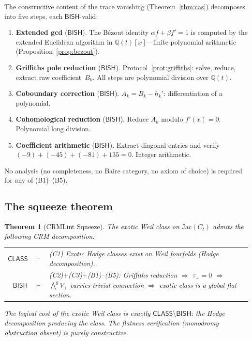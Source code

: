 \documentclass[11pt]{article}
\theoremstyle{plain}
\newtheorem{theorem}{Theorem}[section]
\theoremstyle{definition}
\theoremstyle{remark}
\newcommand{\Q}{\mathbb{Q}}
\newcommand{\BISH}{\ensuremath{\mathsf{BISH}}}
\newcommand{\CLASS}{\ensuremath{\mathsf{CLASS}}}
\begin{document}
The constructive content of the trace vanishing
(Theorem~\ref{thm:cas}) decomposes into five steps, each
$\BISH$-valid:

\begin{enumerate}[nosep,label=(B\arabic*)]
\item \textbf{Extended gcd} ($\BISH$).
  The B\'ezout identity $\alpha f + \beta f' = 1$ is computed by
  the extended Euclidean algorithm in $\Q(t)[x]$---finite polynomial
  arithmetic (Proposition~\ref{prop:bezout}).
\item \textbf{Griffiths pole reduction} ($\BISH$).
  Protocol~\ref{prot:griffiths}: solve, reduce, extract raw
  coefficient~$B_k$.  All steps are polynomial division over $\Q(t)$.
\item \textbf{Coboundary correction} ($\BISH$).
  $A_k = B_k - h_k'$: differentiation of a polynomial.
\item \textbf{Cohomological reduction} ($\BISH$).
  Reduce $A_k$ modulo $f'(x) = 0$.  Polynomial long division.
\item \textbf{Coefficient arithmetic} ($\BISH$).
  Extract diagonal entries and verify
  $(-9) + (-45) + (-81) + 135 = 0$.  Integer arithmetic.
\end{enumerate}

No analysis (no completeness, no Baire category, no axiom of
choice) is required for any of (B1)--(B5).

\subsection{The squeeze theorem}

\begin{theorem}[CRMLint Squeeze]\label{thm:squeeze}
The exotic Weil class on $\mathrm{Jac}(C_t)$ admits the
following CRM decomposition:
\begin{center}
\begin{tabular}{rcp{8cm}}
$\CLASS$ & $\vdash$ & (C1) Exotic Hodge classes exist on
  Weil fourfolds (Hodge decomposition).\\[3pt]
$\BISH$ & $\vdash$ & (C2)$+$(C3)$+$(B1)--(B5):
  Griffiths reduction $\Rightarrow$ $\tau_+ = 0$
  $\Rightarrow$ $\bigwedge^g V_+$ carries trivial connection
  $\Rightarrow$ exotic class is a global flat section.
\end{tabular}
\end{center}
The logical cost of the exotic Weil class is exactly
$\CLASS \setminus \BISH$: the Hodge decomposition producing the
class.  The flatness verification (monodromy obstruction absent)
is purely constructive.
\end{theorem}
\end{document}
